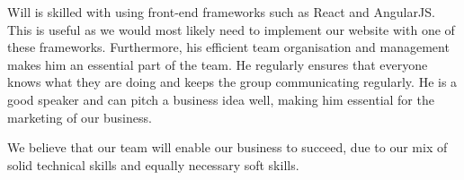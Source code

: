 \documentclass[11pt, a4paper]{article}
\begin{document}
Will is skilled with using front-end frameworks such as React and AngularJS. This is useful as we would most likely need to implement our website with one of these frameworks. Furthermore, his efficient team organisation and management makes him an essential part of the team. He regularly ensures that everyone knows what they are doing and keeps the group communicating regularly. He is a good speaker and can pitch a business idea well, making him essential for the marketing of our business.

We believe that our team will enable our business to succeed, due to our mix of solid  technical skills and equally necessary soft skills.
\end{document}
